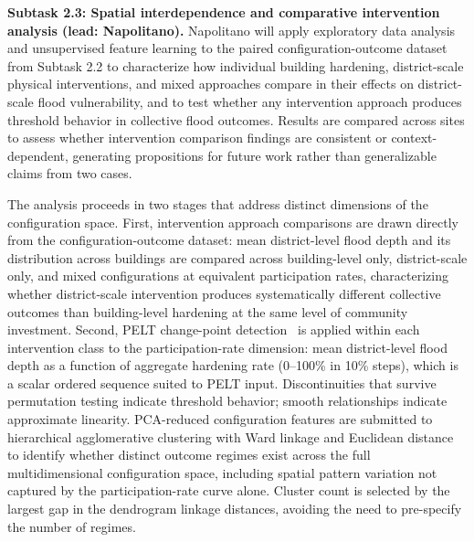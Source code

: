 \documentclass[11pt]{article}
\begin{document}
\textbf{Subtask 2.3: Spatial interdependence and comparative intervention analysis (lead: Napolitano).}
Napolitano will apply exploratory data analysis and unsupervised feature learning
to the paired configuration-outcome dataset from Subtask 2.2 to characterize how
individual building hardening, district-scale physical interventions, and mixed
approaches compare in their effects on district-scale flood vulnerability, and to
test whether any intervention approach produces threshold behavior in collective
flood outcomes.
Results are compared across sites to assess whether intervention comparison findings
are consistent or context-dependent, generating propositions for future work rather
than generalizable claims from two cases.

The analysis proceeds in two stages that address distinct dimensions of the
configuration space.
First, intervention approach comparisons are drawn directly from the
configuration-outcome dataset: mean district-level flood depth and its distribution
across buildings are compared across building-level only, district-scale only, and
mixed configurations at equivalent participation rates, characterizing whether
district-scale intervention produces systematically different collective outcomes
than building-level hardening at the same level of community investment.
Second, PELT change-point detection~\cite{killick2012optimal} is applied within
each intervention class to the participation-rate dimension: mean district-level
flood depth as a function of aggregate hardening rate (0--100\% in 10\% steps),
which is a scalar ordered sequence suited to PELT input.
Discontinuities that survive permutation testing indicate threshold behavior;
smooth relationships indicate approximate linearity.
PCA-reduced configuration features are submitted to hierarchical agglomerative
clustering with Ward linkage and Euclidean distance~\cite{ward1963hierarchical}
to identify whether distinct outcome regimes exist across the full multidimensional
configuration space, including spatial pattern variation not captured by the
participation-rate curve alone.
Cluster count is selected by the largest gap in the dendrogram linkage distances,
avoiding the need to pre-specify the number of regimes.
\end{document}
